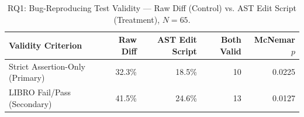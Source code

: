 \begin{table}[t]
\centering
\caption{RQ1: Bug-Reproducing Test Validity --- Raw Diff (Control) vs. AST Edit Script (Treatment), $N=65$.}
\label{tab:rq1_validity}
\begin{tabular}{lrrrr}
\toprule
Validity Criterion & Raw Diff & AST Edit Script & Both Valid & McNemar $p$ \\
\midrule
Strict Assertion-Only (Primary) & 32.3\% & 18.5\% & 10 & 0.0225 \\
LIBRO Fail/Pass (Secondary) & 41.5\% & 24.6\% & 13 & 0.0127 \\
\bottomrule
\end{tabular}
\end{table}
